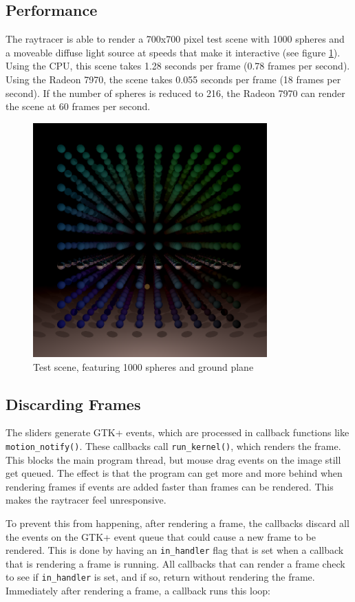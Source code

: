 \documentclass{article}
\begin{document}
\subsection{Performance}
The raytracer is able to render a 700x700 pixel test scene with 1000 spheres and a moveable diffuse light source at speeds that make it interactive (see figure \ref{fig:testscene}). Using the CPU, this scene takes 1.28 seconds per frame (0.78 frames per second). Using the Radeon 7970, the scene takes 0.055 seconds per frame (18 frames per second). If the number of spheres is reduced to 216, the Radeon 7970 can render the scene at 60 frames per second.

\begin{figure}[ht!]
\centering
\includegraphics[width=90mm]{scene.png}
\caption{Test scene, featuring 1000 spheres and ground plane}
\label{fig:testscene}
\end{figure}

\subsection{Discarding Frames}
The sliders generate GTK+ events, which are processed in callback functions like \texttt{motion\_notify()}. These callbacks call \texttt{run\_kernel()}, which renders the frame. This blocks the main program thread, but mouse drag events on the image still get queued. The effect is that the program can get more and more behind when rendering frames if events are added faster than frames can be rendered. This makes the raytracer feel unresponsive.

To prevent this from happening, after rendering a frame, the callbacks discard all the events on the GTK+ event queue that could cause a new frame to be rendered. This is done by having an \texttt{in\_handler} flag that is set when a callback that is rendering a frame is running. All callbacks that can render a frame check to see if \texttt{in\_handler} is set, and if so, return without rendering the frame. Immediately after rendering a frame, a callback runs this loop:
\end{document}
